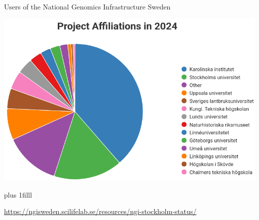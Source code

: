 \documentclass[10pt]{beamer}
\newcommand{\credit}[1]{{\vskip0pt plus 1filll \par \raggedleft \scriptsize \mdseries \color{mDarkBrown} #1 \par}}
\begin{document}
\begin{frame}{Users of the National Genomics Infrastructure Sweden}
	\begin{center}
		\hspace*{-1cm}
		\includegraphics[height=0.7\textheight]{./figures/ngi-users-2024.png}
	\end{center}
	\credit{\href{https://ngisweden.scilifelab.se/resources/ngi-stockholm-status/}{https://ngisweden.scilifelab.se/resources/ngi-stockholm-status/}}
\end{frame}
\end{document}
